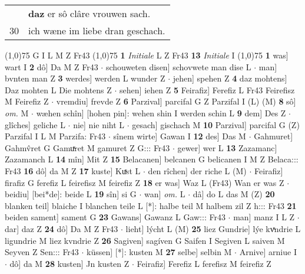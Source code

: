 \documentclass[8pt,a4paper,notitlepage]{article}
\begin{document}
\begin{table}[ht]
\begin{minipage}[t]{0.5\linewidth}
\begin{tabular}{rl}
 & \textbf{daz} er sô clâre vrouwen sach.\\ 
30 & ich wæne im liebe dran geschach.\\ 
\end{tabular}
\scriptsize
\line(1,0){75} \newline
G I L M Z Fr43 \newline
\line(1,0){75} \newline
\textbf{1} \textit{Initiale} L Z Fr43  \textbf{13} \textit{Initiale} I  \newline
\line(1,0){75} \newline
\textbf{1} was] wart I \textbf{2} dô] Da M Z Fr43  $\cdot$ schouweten disen] schovwete man dise L  $\cdot$ man] bvnten man Z \textbf{3} werdes] werden L wunder Z  $\cdot$ jehen] spehen Z \textbf{4} daz mohtens] Daz mohten L Die mohtens Z  $\cdot$ sehen] iehen Z \textbf{5} Feirafiz] Ferefiz L Fr43 Feirefisz M Feirefiz Z  $\cdot$ vremdiu] frevde Z \textbf{6} Parzival] parcifal G Z Parzifal I (L) (M) \textbf{8} sô] \textit{om.} M  $\cdot$ wæhen schîn] [hohen pin]: wehen shin I werden schin L \textbf{9} dem] Des Z  $\cdot$ glîches] geliche L  $\cdot$ nie] nie niht L  $\cdot$ gesach] gischach M \textbf{10} Parzival] parcifal G (Z) Parzifal I L M Parzifa: Fr43  $\cdot$ sînem wirte] Gawan I \textbf{12} des] Das M  $\cdot$ Gahmuret] Gahmv̂ret G Gamuͯret M gamuret Z G::: Fr43  $\cdot$ gewer] wer L \textbf{13} Zazamanc] Zazamanch L \textbf{14} mîn] Mit Z \textbf{15} Belacanen] belcanen G belicanen I M Z Belaca::: Fr43 \textbf{16} dô] da M Z \textbf{17} kuste] Kuͯst L  $\cdot$ den rîchen] der riche L (M)  $\cdot$ Feirafiz] firafiz G ferefiz L feirefisz M feirefiz Z \textbf{18} er was] Waz L (Fr43) Wan er was Z  $\cdot$ beidiu] [bei*de]: beide L \textbf{19} sîn] si G  $\cdot$ wan] \textit{om.} L  $\cdot$ dâ] do L das M (Z) \textbf{20} blanken teil] blaiche I blanchen teile L [*]: halbe teil M halbem zil Z h::: Fr43 \textbf{21} beiden sament] sament G \textbf{23} Gawans] Gawanz L Gaw::: Fr43  $\cdot$ man] manz I L Z  $\cdot$ dar] daz Z \textbf{24} dô] Da M Z Fr43  $\cdot$ lieht] lýcht L (M) \textbf{25} liez Gundrie] lýe kvͯndrie L ligundrie M liez kvndrie Z \textbf{26} Sagiven] sagíven G Saifen I Segiven L saiven M Seyven Z Sen::: Fr43  $\cdot$ küssen] [*]: kusten M \textbf{27} selbe] selbin M  $\cdot$ Arnive] arniue I  $\cdot$ dô] da M \textbf{28} kusten] Jn kusten Z  $\cdot$ Feirafiz] Ferefiz L ferefisz M feirefiz Z \newline
\end{minipage}
\hspace{0.5cm}

\end{table}
\end{document}
